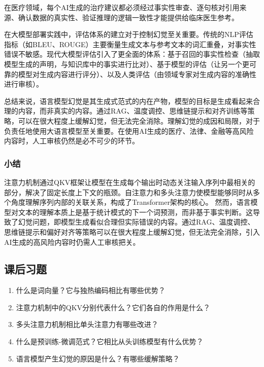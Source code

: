 在医疗领域，每个AI生成的治疗建议都必须经过事实性审查、逐句核对引用来源、确认数据的真实性、验证推理的逻辑一致性才能提供给临床医生参考。







在大模型部署实践中，评估体系的建立对于控制幻觉至关重要。传统的NLP评估指标（如BLEU、ROUGE）主要衡量生成文本与参考文本的词汇重叠，对事实性错误不敏感。现代大模型评估引入了更全面的体系：基于召回的事实性检查（抽取模型生成的声明，与知识库中的事实进行比对）、基于模型的评估（让另一个更可靠的模型对生成内容进行评分）、以及人类评估（由领域专家对生成内容的准确性进行审核）。



总结来说，语言模型幻觉是其生成式范式的内在产物，模型的目标是生成看起来合理的内容，而非真实的内容。通过RAG、温度调控、思维链提示和对齐训练等策略，可以在很大程度上缓解幻觉，但无法完全消除。理解幻觉的成因和局限，对于负责任地使用大语言模型至关重要。在使用AI生成的医疗、法律、金融等高风险内容时，人工审核仍然是必不可少的环节。



\subsubsection*{小结}

注意力机制通过QKV框架让模型在生成每个输出时动态关注输入序列中最相关的部分，解决了固定长度上下文的瓶颈。自注意力和多头注意力使模型能够同时从多个角度理解序列内部的关联关系，构成了Transformer架构的核心。
然而，语言模型对文本的理解本质上是基于统计模式的下一个词预测，而非基于事实判断。这导致了幻觉问题，即模型生成看似合理但实际错误的内容。通过RAG、温度调控、思维链提示和偏好对齐等策略可以在很大程度上缓解幻觉，但无法完全消除，引入AI生成的高风险内容时仍需人工审核把关。


\bigskip
\subsection*{课后习题}

\begin{enumerate}
\setlength{\itemsep}{6pt}
\item 什么是词向量？它与独热编码相比有哪些优势？
\item 注意力机制中的QKV分别代表什么？它们各自的作用是什么？
\item 多头注意力机制相比单头注意力有哪些改进？
\item 什么是预训练-微调范式？它相比从头训练模型有什么优势？
\item 语言模型产生幻觉的原因是什么？有哪些缓解策略？
\end{enumerate}


